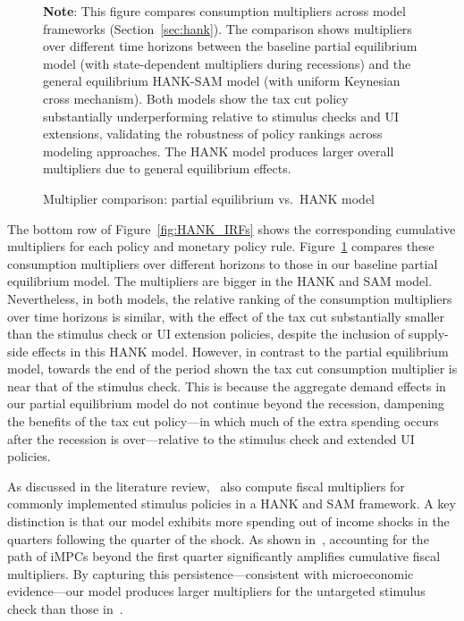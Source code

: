 \documentclass[qe,draft]{econsocart}
\theoremstyle{plain}
\theoremstyle{definition}
\begin{document}
\begin{figure}[htb] 
  \centering
  \caption{\pregenmark Multiplier comparison: partial equilibrium vs.\ HANK model}
  \label{fig:HANK_multipliers} %

  \medskip
  \noindent\parbox{\textwidth}{\footnotesize
    \textbf{Note}: This figure compares consumption multipliers across model frameworks (Section~\ref{sec:hank}).
    The comparison shows multipliers over different time horizons
    between the baseline partial equilibrium model (with state-dependent multipliers during recessions)
    and the general equilibrium HANK-SAM model (with uniform Keynesian cross mechanism).
    Both models show the tax cut policy substantially underperforming relative to stimulus checks
    and UI extensions, validating the robustness of policy rankings across modeling approaches.
    The HANK model produces larger overall multipliers due to general equilibrium effects.
  }
\end{figure}

\vspace{0.5em}


The bottom row of Figure~\ref{fig:HANK_IRFs} shows the corresponding cumulative multipliers for each policy and monetary policy rule. Figure~\ref{fig:HANK_multipliers} compares these consumption multipliers over different horizons to those in our baseline partial equilibrium model.
The multipliers are bigger in the HANK and SAM model.
Nevertheless, in both models, the relative ranking of the consumption multipliers over time horizons is similar, with the effect of the tax cut substantially smaller than the stimulus check or UI extension policies, despite the inclusion of supply-side effects in this HANK model.
However, in contrast to the partial equilibrium model, towards the end of the period shown the tax cut consumption multiplier is near that of the stimulus check.
This is because the aggregate demand effects in our partial equilibrium model do not continue beyond the recession, dampening the benefits of the tax cut policy---in which much of the extra spending occurs after the recession is over---relative to the stimulus check and extended UI policies.

As discussed in the literature review,~\cite{broer2025stimulus} also compute fiscal multipliers for commonly implemented stimulus policies in a HANK and SAM framework. A key distinction is that our model exhibits more spending out of income shocks in the quarters following the quarter of the shock. As shown in~\cite{auclert2024IKC}, accounting for the path of iMPCs beyond the first quarter significantly amplifies cumulative fiscal multipliers. By capturing this persistence—consistent with microeconomic evidence—our model produces larger multipliers for the untargeted stimulus check than those in~\cite{broer2025stimulus}.
\end{document}
